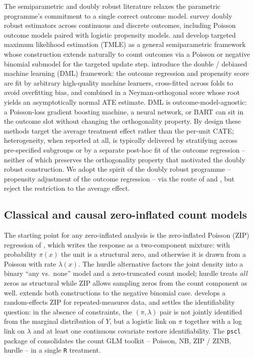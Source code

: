 \documentclass[11pt]{article}
\theoremstyle{plain}
\theoremstyle{definition}
\theoremstyle{remark}
\begin{document}
The semiparametric and doubly robust literature relaxes the
parametric programme's commitment to a single correct outcome model.
\citet{funk2011doubly} survey doubly robust estimators across
continuous and discrete outcomes, including Poisson outcome models
paired with logistic propensity models. \citet{van2010targetedI} and
\citet{vanderlaan2011targeted} develop targeted maximum likelihood
estimation (TMLE) as a general semiparametric framework whose
construction extends naturally to count outcomes via a Poisson or
negative binomial submodel for the targeted update step.
\citet{chernozhukov2018double} introduce the double / debiased machine
learning (DML) framework: the outcome regression and propensity
score are fit by arbitrary high-quality machine learners, cross-fitted
across folds to avoid overfitting bias, and combined in a
Neyman-orthogonal score whose root yields an asymptotically normal
ATE estimate. DML is outcome-model-agnostic: a Poisson-loss gradient
boosting machine, a neural network, or BART can sit in the outcome
slot without changing the orthogonality property. By design these
methods target the average treatment effect rather than the per-unit
CATE; heterogeneity, when reported at all, is typically delivered by
stratifying across pre-specified subgroups or by a separate post-hoc
fit of the outcome regression -- neither of which preserves the
orthogonality property that motivated the doubly robust construction.
We adopt the spirit of the doubly robust programme -- propensity
adjustment of the outcome regression -- via the route of
\citet{hansen2008prognostic} and \citet{hahn2020bayesian}, but reject
the restriction to the average effect.

\subsection{Classical and causal zero-inflated count
models}\label{sec:lit-zi}

The starting point for any zero-inflated analysis is the
zero-inflated Poisson (ZIP) regression of \citet{lambert1992zip},
which writes the response as a two-component mixture: with
probability $\pi(x)$ the unit is a structural zero, and otherwise it
is drawn from a Poisson with rate $\lambda(x)$. The hurdle
alternative \citep{mullahy1986hurdle} factors the joint density into
a binary ``any vs.\ none'' model and a zero-truncated count model;
hurdle treats \emph{all} zeros as structural while ZIP allows
sampling zeros from the count component as well.
\citet{greene1994zinb} extends both constructions to the negative
binomial case. \citet{hall2000zip} develops a random-effects ZIP for
repeated-measures data, and \citet{li2012zipidentifiability} settles
the identifiability question: in the absence of constraints, the
$(\pi, \lambda)$ pair is not jointly identified from the marginal
distribution of $Y$, but a logistic link on $\pi$ together with a log
link on $\lambda$ and at least one continuous covariate restore
identifiability. The \texttt{pscl} package of
\citet{zeileis2008regression} consolidates the count GLM toolkit --
Poisson, NB, ZIP / ZINB, hurdle -- in a single \texttt{R} treatment.
\end{document}
